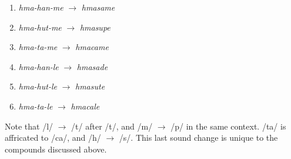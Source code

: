 \begin{enumerate}
	\item \textit{hma-han-me} $\rightarrow$ \textit{hmasame} 
	\item \textit{hma-hut-me} $\rightarrow$ \textit{hmasupe} 
	\item \textit{hma-ta-me} $\rightarrow$ \textit{hmacame} 
	\item \textit{hma-han-le} $\rightarrow$ \textit{hmasade} 
	\item \textit{hma-hut-le} $\rightarrow$ \textit{hmasute} 
	\item \textit{hma-ta-le} $\rightarrow$ \textit{hmacale} 
\end{enumerate}

Note that /l/ $\rightarrow$ /t/ after /t/, and /m/ $\rightarrow$ /p/ in the same context. /ta/ is affricated to /ca/, and /h/ $\rightarrow$ /s/. This last sound change is unique to the compounds discussed above.

%
%
%

